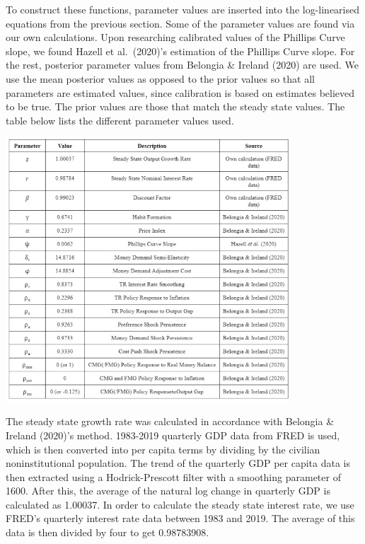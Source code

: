 \documentclass[11pt,preprint, authoryear]{elsarticle}
\let\origfigure\figure
\let\endorigfigure\endfigure
\renewenvironment{figure}[1][2] {
    \expandafter\origfigure\expandafter[H]
} {
    \endorigfigure
}
\numberwithin{equation}{section}
\numberwithin{figure}{section}
\numberwithin{table}{section}
\begin{document}
To construct these functions, parameter values are inserted into the
log-linearised equations from the previous section. Some of the
parameter values are found via our own calculations. Upon researching
calibrated values of the Phillips Curve slope, we found Hazell et
al.~(2020)'s estimation of the Phillips Curve slope. For the rest,
posterior parameter values from Belongia \& Ireland (2020) are used. We
use the mean posterior values as opposed to the prior values so that all
parameters are estimated values, since calibration is based on estimates
believed to be true. The prior values are those that match the steady
state values. The table below lists the different parameter values used.

\begin{figure}
\centering
\includegraphics[width=0.8\textwidth,height=0.5\textheight]{./figures/Table.jpeg}
\caption{Parameter Values}
\end{figure}

The steady state growth rate was calculated in accordance with Belongia
\& Ireland (2020)'s method. 1983-2019 quarterly GDP data from FRED is
used, which is then converted into per capita terms by dividing by the
civilian noninstitutional population. The trend of the quarterly GDP per
capita data is then extracted using a Hodrick-Prescott filter with a
smoothing parameter of 1600. After this, the average of the natural log
change in quarterly GDP is calculated as 1.00037. In order to calculate
the steady state interest rate, we use FRED's quarterly interest rate
data between 1983 and 2019. The average of this data is then divided by
four to get 0.98783908.
\end{document}
